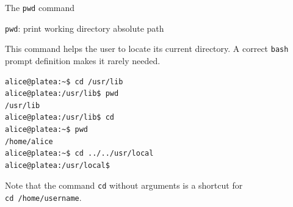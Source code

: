 \begin{frame}[fragile]{The \texttt{pwd} command}
  
  \begin{block}{ \alert{\texttt{pwd}}: print working directory absolute path}
    
      {\footnotesize  This command helps the user to locate its current directory. A correct \texttt{bash} prompt definition makes it rarely needed.}

    {\scriptsize
      \begin{lstlisting}
alice@platea:~$ cd /usr/lib
alice@platea:/usr/lib$ pwd
/usr/lib
alice@platea:/usr/lib$ cd
alice@platea:~$ pwd
/home/alice
alice@platea:~$ cd ../../usr/local
alice@platea:/usr/local$ 
      \end{lstlisting}
}

    {\footnotesize
Note that the command \texttt{cd} without arguments is a shortcut for
\\
\texttt{cd /home/username}.
}

\end{block}


\end{frame}

